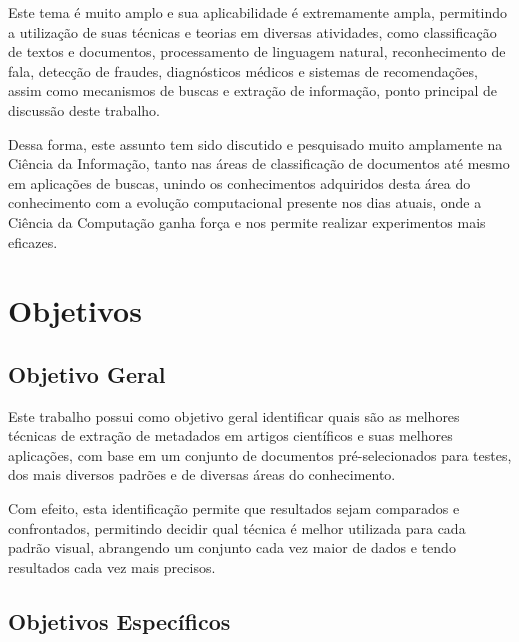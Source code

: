 Este tema é muito amplo e sua aplicabilidade é extremamente ampla, permitindo a utilização de suas técnicas e teorias em diversas atividades, como classificação de textos e documentos, processamento de linguagem natural, reconhecimento de fala, detecção de fraudes, diagnósticos médicos e sistemas de recomendações, assim como mecanismos de buscas e extração de informação, ponto principal de discussão deste trabalho.

Dessa forma, este assunto tem sido discutido e pesquisado muito amplamente na Ciência da Informação, tanto nas áreas de classificação de documentos até mesmo em aplicações de buscas, unindo os conhecimentos adquiridos desta área do conhecimento com a evolução computacional presente nos dias atuais, onde a Ciência da Computação ganha força e nos permite realizar experimentos mais eficazes.

\section{Objetivos}

\subsection{Objetivo Geral}

Este trabalho possui como objetivo geral identificar quais são as melhores técnicas de extração de metadados em artigos científicos e suas melhores aplicações, com base em um conjunto de documentos pré-selecionados para testes, dos mais diversos padrões e de diversas áreas do conhecimento.

Com efeito, esta identificação permite que resultados sejam comparados e confrontados, permitindo decidir qual técnica é melhor utilizada para cada padrão visual, abrangendo um conjunto cada vez maior de dados e tendo resultados cada vez mais precisos.


\subsection{Objetivos Específicos}

